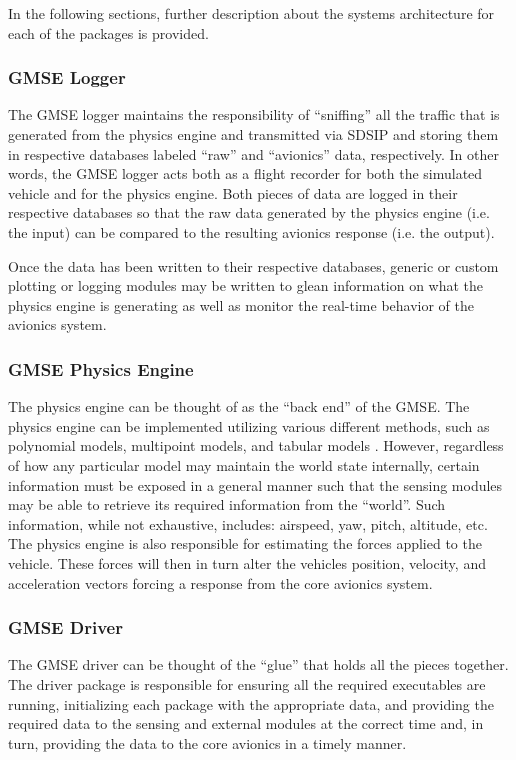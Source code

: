 In the following sections, further description about the systems architecture for each of the packages is provided.

\subsubsection{GMSE Logger}

The GMSE logger maintains the responsibility of ``sniffing'' all the traffic that is generated from the physics engine
and transmitted via SDSIP and storing them in respective databases labeled ``raw'' and ``avionics'' data, respectively.
In other words, the GMSE logger acts both as a flight recorder for both the simulated vehicle and for the physics
engine. Both pieces of data are logged in their respective databases so that the raw data generated by the physics
engine (i.e. the input) can be compared to the resulting avionics response (i.e. the output).

Once the data has been written to their respective databases, generic or custom plotting or logging modules may be
written to glean information on what the physics engine is generating as well as monitor the real-time behavior of the
avionics system.

\subsubsection{GMSE Physics Engine}

The physics engine can be thought of as the ``back end'' of the GMSE. The physics engine can be implemented utilizing
various different methods, such as polynomial models, multipoint models, and tabular models
\cite{banks_discussion_nodate}. However, regardless of how any particular model may maintain the world state internally,
certain information must be exposed in a general manner such that the sensing modules may be able to retrieve its
required information from the ``world''. Such information, while not exhaustive, includes: airspeed, yaw, pitch,
altitude, etc. The physics engine is also responsible for estimating the forces applied to the vehicle. These forces
will then in turn alter the vehicles position, velocity, and acceleration vectors forcing a response from the core
avionics system.

\subsubsection{GMSE Driver}

The GMSE driver can be thought of the ``glue'' that holds all the pieces together. The driver package is responsible for
ensuring all the required executables are running, initializing each package with the appropriate data, and providing
the required data to the sensing and external modules at the correct time and, in turn, providing the data to the core
avionics in a timely manner.

